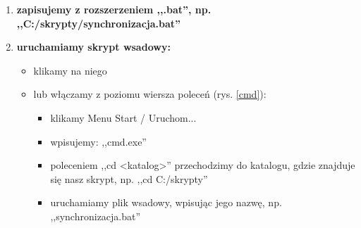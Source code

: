 \begin{enumerate}
\begin{itemize}
\begin{center}
\end{center}
\item \verb|SET CEL=...| - podajemy miejsce docelowe,
\item \verb|SET ZRODLO=...| - podajemy lokalizację źródłową; tutaj wymagane jest dłuższe wyjaśnienie.\\W Windowsie ścieżki składają się z litery dysku (np. C, D, E), dwukropka i odwróconego ukośnika (np. \verb|C:\katalog|). Użycie znaku dwukropka, w składni polecenia \verb|rsync|, zostałoby potraktowane jako ścieżka do katalogu zdalnego, dlatego stosujemy tu konwencję znaną z UNIX'a, to jest: zamieniamy odwrócone ukośniki na nieodwrócone, a w miejsce litery dysku wpisujemy \verb|/cygdrive/<litera_dysku>|. W ten sposób nasza przykładowa lokalizacja wygląda następująco: \verb|/cygdrive/c/katalog|.
\end{itemize}

\item \textbf{zapisujemy z rozszerzeniem ,,.bat'', np. ,,C:/skrypty/synchronizacja.bat''}

\item \textbf{uruchamiamy skrypt wsadowy:}
\begin{itemize}
\item klikamy na niego 
\item lub włączamy z poziomu wiersza poleceń (rys. \ref{cmd}):
\begin{itemize}
\item klikamy Menu Start / Uruchom...
\item wpisujemy: ,,cmd.exe''
\item poleceniem ,,cd <katalog>'' przechodzimy do katalogu, gdzie znajduje się nasz skrypt, np. ,,cd C:/skrypty''
\item uruchamiamy plik wsadowy, wpisując jego nazwę, np. ,,synchronizacja.bat''
\end{itemize}
\end{itemize}


\end{enumerate}

